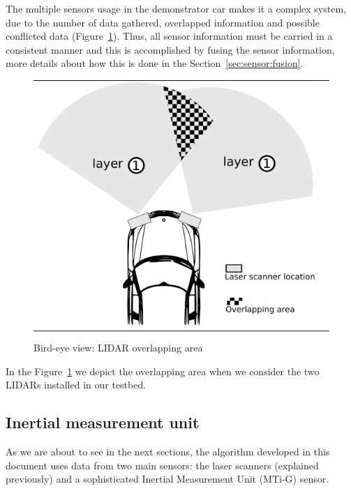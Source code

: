 The multiple sensors usage in the demonstrator car makes it a complex system, due to the number of data gathered, overlapped information and possible conflicted data (Figure~\ref{fig:demonstrator:superior:overlap}). Thus, all sensor information must be carried in a consistent manner and this is accomplished by fusing the sensor information, more details about how this is done in the Section~\ref{sec:sensor:fusion}.

\begin{figure}[h]
   \centering
     \begin{tabular}{lr}
       \includegraphics[scale=0.5]{img/fig:demonstrator:superior:overlap}
     \end{tabular}
   \caption{Bird-eye view: LIDAR overlapping area}
   \label{fig:demonstrator:superior:overlap}
\end{figure}

In the Figure~\ref{fig:demonstrator:superior:overlap} we depict the overlapping area when we consider the two LIDARs installed in our testbed.

\subsection{Inertial measurement unit}

As we are about to see in the next sections, the algorithm developed in this document uses data from two main sensors: the laser scanners (explained previously) and a sophisticated Inertial Measurement Unit (MTi-G) sensor.

